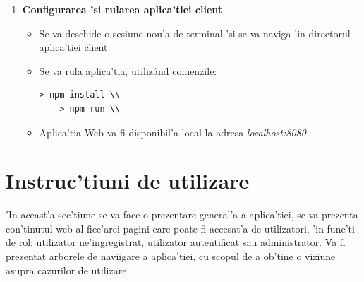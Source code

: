 \documentclass[12pt,a4paper,twoside]{report}
\begin{document}
\begin{enumerate}[label=Pasul \arabic*]
\item{\textbf{Configurarea 'si rularea aplica'tiei client}
\begin{itemize}
\item{Se va deschide o sesiune nou'a de terminal 'si se va naviga 'in directorul aplica'tiei client}
\item{Se va rula aplica'tia, utilizând comenzile:
\begin{tcolorbox}\label{run_client}
    \scriptsize{
    \begin{Verbatim}[commandchars=\\\{\}]
	> npm install \\
	> npm run \\
    \end{Verbatim}
    }
    \end{tcolorbox} 
}
\item{Aplica'tia Web va fi disponibil'a local la adresa \textit{localhost:8080}   } 
\end{itemize}
}
\end{enumerate}
\section{Instruc'tiuni de utilizare}
'In aceast'a sec'tiune se va face o prezentare general'a a aplica'tiei, se va prezenta con'tinutul web al fiec'arei pagini care poate fi accesat'a de utilizatori, 'in func'ti de rol: utilizator ne'ingregistrat, utilizator autentificat sau administrator. Va fi prezentat arborele de naviigare a aplica'tiei, cu scopul de a ob'tine o viziune asupra cazurilor de utilizare.
\end{document}
